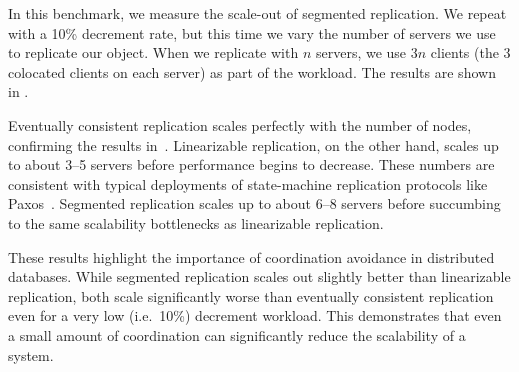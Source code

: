 \begin{benchmark}
  In this benchmark, we measure the scale-out of segmented
  \invariantconfluent{} replication. We repeat  with a
  10\% decrement rate, but this time we vary the number of servers we use to
  replicate our object.  When we replicate with $n$ servers, we use $3n$
  clients (the $3$ colocated clients on each server) as part of the workload.
  The results are shown in .

  Eventually consistent replication scales perfectly with the number of nodes,
  confirming the results in~\cite{bailis2014coordination}.  Linearizable
  replication, on the other hand, scales up to about 3--5 servers before
  performance begins to decrease. These numbers are consistent with typical
  deployments of state-machine replication protocols like
  Paxos~\cite{chandra2007paxos}. Segmented \invariantconfluent{} replication
  scales up to about 6--8 servers before succumbing to the same scalability
  bottlenecks as linearizable replication.

  These results highlight the importance of coordination avoidance in
  distributed databases. While segmented \invariantconfluent{} replication
  scales out slightly better than linearizable replication, both scale
  significantly worse than eventually consistent replication even for a very
  low (i.e.\ 10\%) decrement workload. This demonstrates that even a small
  amount of coordination can significantly reduce the scalability of a system.
\end{benchmark}
